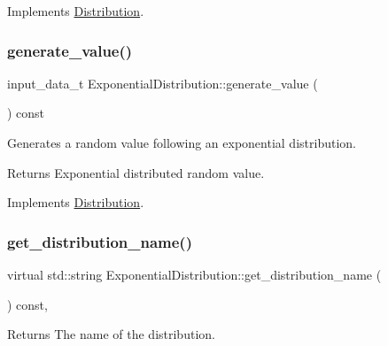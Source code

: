 Implements \hyperlink{classDistribution_a5146d1193531b15a872d401cb97f06ca}{Distribution}.

\mbox{\label{classExponentialDistribution_a00e0abeff4f9e4cc64926de49d027711}} 
\subsubsection{\texorpdfstring{generate\+\_\+value()}{generate\_value()}}
{\footnotesize\ttfamily input\+\_\+data\+\_\+t Exponential\+Distribution\+::generate\+\_\+value (\begin{DoxyParamCaption}{ }\end{DoxyParamCaption}) const\hspace{0.3cm}{\ttfamily [virtual]}}

Generates a random value following an exponential distribution. \begin{DoxyReturn}{Returns}
Exponential distributed random value. 
\end{DoxyReturn}


Implements \hyperlink{classDistribution_a096af8a5e59bd38e0ad7da10632e0c83}{Distribution}.

\mbox{\label{classExponentialDistribution_a98ac6f2df798ae19bc371a2f071e21bb}} 
\subsubsection{\texorpdfstring{get\+\_\+distribution\+\_\+name()}{get\_distribution\_name()}}
{\footnotesize\ttfamily virtual std\+::string Exponential\+Distribution\+::get\+\_\+distribution\+\_\+name (\begin{DoxyParamCaption}{ }\end{DoxyParamCaption}) const\hspace{0.3cm}{\ttfamily [inline]}, {\ttfamily [virtual]}}

\begin{DoxyReturn}{Returns}
The name of the distribution. 
\end{DoxyReturn}


